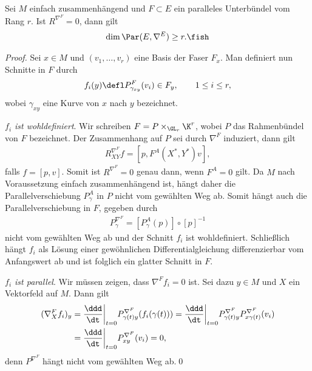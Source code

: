 \documentclass[%
	paper=a5,%
	fleqn,%
	DIV=18,%
	BCOR=0mm,
	fontsize=11pt,
	titlepage=false,%
	bibliography=totoc,
	DIV=18,%
	twoside=true,
	pdftitle=Riemannsche Geometrie,
	pdfauthor=Uwe Semmelmann,
	numbers=noendperiod]%
	{scrbook}
\begin{document}
\begin{prop}
Sei $M$ einfach zusammenhängend und $F\subset E$ ein paralleles Unterbündel vom
Rang $r$. Ist $R^{\nabla^F} = 0$, dann gilt
\begin{align*}
\dim \Par(E,\nabla^E) \ge r.\fish
\end{align*}
\end{prop}
\begin{proof}
Sei $x\in M$ und $(v_1,\ldots,v_r)$ eine Basis der Faser $F_x$. Man definiert
nun Schnitte in $F$ durch
\begin{align*}
f_i(y) \defl P_{\gamma_{xy}}^F(v_i) \in F_y,\qquad 1\le i\le r,
\end{align*} 
wobei $\gamma_{xy}$ eine Kurve von $x$ nach $y$ bezeichnet. 

\textit{$f_i$ ist wohldefiniert}. Wir schreiben $F= P\times_{\GL_r} \K^r$, wobei
$P$ das Rahmenbündel von $F$ bezeichnet. Der Zusammenhang auf $P$ sei durch
$\nabla^F$ induziert, dann gilt
\begin{align*}
R_{XY}^{\nabla^F}f = [p,F^A(X^*,Y^*)v],
\end{align*}
falls $f=[p,v]$. Somit ist $R^{\nabla^F} = 0$ genau dann, wenn $F^A = 0$ gilt.
Da $M$ nach Voraussetzung einfach zusammenhängend ist, hängt daher die
Parallelverschiebung $P_\gamma^A$ in $P$ nicht vom gewählten Weg ab. Somit
hängt auch die Parallelverschiebung in $F$, gegeben durch
\begin{align*}
P^{\nabla^F}_\gamma = [P_\gamma^A(p)]\circ[p]^{-1}
\end{align*}
nicht vom gewählten Weg ab und der Schnitt $f_i$ ist wohldefiniert. Schließlich hängt $f_{i}$ als Lösung einer gewöhnlichen Differentialgleichung differenzierbar vom Anfangswert ab und ist folglich ein glatter Schnitt in $F$.

\textit{$f_i$ ist parallel}. Wir müssen zeigen, dass $\nabla^F f_i = 0$ ist.
Sei dazu $y\in M$ und $X$ ein Vektorfeld auf $M$. Dann gilt
\begin{align*}
(\nabla_X^F f_i)_y  &= 
\frac{\ddd}{\dt}\bigg|_{t=0} P_{\gamma(t)y}^{\nabla^F}(f_i(\gamma(t)))
= 
\frac{\ddd}{\dt}\bigg|_{t=0}
P_{\gamma(t)y}^{\nabla^F}P_{x\gamma(t)}^{\nabla^F}(v_i)\\
&
= 
\frac{\ddd}{\dt}\bigg|_{t=0}
P_{xy}^{\nabla^F}(v_i) = 0,
\end{align*}
denn $P^{\nabla^F}$ hängt nicht vom gewählten Weg ab.\qed 
\end{proof}
\end{document}
